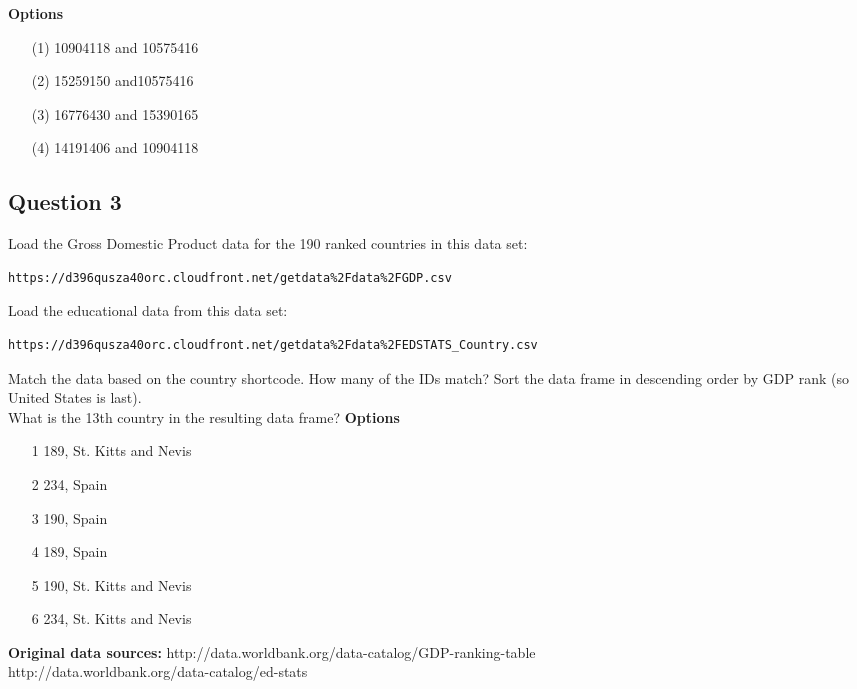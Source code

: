 \documentclass[]{article}
\begin{document}
\bigskip
\textbf{Options}
\begin{itemize}
\item[(1)] 10904118 and 10575416
\item[(2)] 15259150 and10575416
\item[(3)] 16776430 and 15390165
\item[(4)] 14191406  and 10904118
\end{itemize}
\newpage
\subsection*{Question 3}
Load the Gross Domestic Product data for the 190 ranked countries in this data set: 

\begin{verbatim}
https://d396qusza40orc.cloudfront.net/getdata%2Fdata%2FGDP.csv 
\end{verbatim}
Load the educational data from this data set: 
\begin{verbatim}
https://d396qusza40orc.cloudfront.net/getdata%2Fdata%2FEDSTATS_Country.csv 
\end{verbatim}
Match the data based on the country shortcode. How many of the IDs match? Sort the data frame in descending order by GDP rank (so United States is last). 
\\
What is the 13th country in the resulting data frame? 
\bigskip
\textbf{Options}
\begin{itemize}
\item[1] 189, St. Kitts and Nevis
\item[2] 234, Spain
\item[3] 190, Spain
\item[4] 189, Spain
\item[5] 190, St. Kitts and Nevis
\item[6] 234, St. Kitts and Nevis
\end{itemize}

\textbf{Original data sources:} 
http://data.worldbank.org/data-catalog/GDP-ranking-table \\
http://data.worldbank.org/data-catalog/ed-stats\\
\newpage
\end{document}

